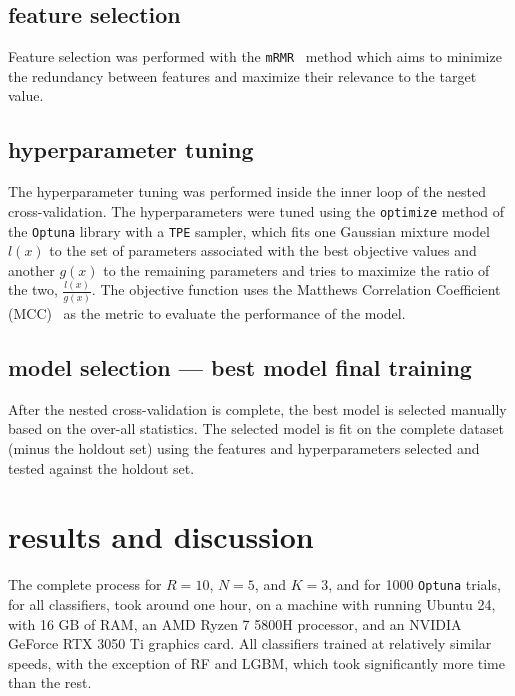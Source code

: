 \documentclass[12pt]{article}
\begin{document}
\subsection{feature selection}

Feature selection was performed with the \texttt{mRMR}~\cite{mRMR}
method which aims to minimize the redundancy between features and maximize their
relevance to the target value.


\subsection{hyperparameter tuning}

The hyperparameter tuning was performed inside the inner loop of the nested
cross-validation. The hyperparameters were tuned using the \texttt{optimize}
method of the \texttt{Optuna} library with a \texttt{TPE} sampler, which fits
one Gaussian mixture model $l(x)$ to the set of parameters associated with the
best objective values and another $g(x)$ to the remaining parameters and tries
to maximize the ratio of the two, $\frac{l(x)}{g(x)}$. The objective function
uses the Matthews Correlation Coefficient (MCC)~\cite{Chicco2023} as the metric
to evaluate the performance of the model.


\subsection{model selection --- best model final training}

After the nested cross-validation is complete, the best model is selected
manually based on the over-all statistics. The selected model is fit on the
complete dataset (minus the holdout set) using the features and hyperparameters
selected and tested against the holdout set. 


\section{results and discussion}

The complete process for $R=10$, $N=5$, and $K=3$, and for 1000 \texttt{Optuna}
trials, for all classifiers, took around one hour, on a machine with running
Ubuntu 24, with 16 GB of RAM, an AMD Ryzen 7 5800H processor, and an
NVIDIA GeForce RTX 3050 Ti graphics card. All classifiers trained at relatively
similar speeds, with the exception of RF and LGBM, which took significantly
more time than the rest.
\end{document}
